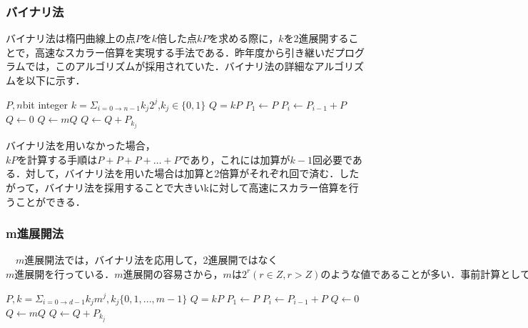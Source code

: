 \documentclass[openany,11pt,papersize]{jsbook}
\begin{document}
\subsubsection{バイナリ法}
バイナリ法は楕円曲線上の点$Pをk倍した点kPを求める際に，k$を2進展開することで，高速なスカラー倍算を実現する手法である．昨年度から引き継いだプログラムでは，このアルゴリズムが採用されていた．バイナリ法の詳細なアルゴリズムを以下に示す．

\begin{algorithm}[H]                   
\caption{binary method}
\label{alg:algB}                          
\begin{algorithmic}                  
\REQUIRE $P, n$bit integer $k = {\displaystyle \Sigma_{i=0 \rightarrow n-1}}k_j 2^j$,$k_j \in \{0,1\}$
\ENSURE $Q = kP$
\STATE $P_1 \leftarrow P$
\STATE $P_i \leftarrow P_{i-1} + P$
\ENDFOR
\STATE $Q \leftarrow 0$
\STATE $Q \leftarrow mQ$
\STATE $Q \leftarrow Q+P_{k_j}$
\ENDFOR
\end{algorithmic}
\end{algorithm}

バイナリ法を用いなかった場合，$kPを計算する手順はP+P+P+…+Pであり，これには加算がk-1$回必要である．対して，バイナリ法を用いた場合は加算と2倍算がそれぞれ回で済む．したがって，バイナリ法を採用することで大きいkに対して高速にスカラー倍算を行うことができる．


\subsubsection{m進展開法}
　$m$進展開法では，バイナリ法を応用して，2進展開ではなく$m進展開を行っている．m進展開の容易さから，mは2^r(r\in Z, r>Z)のような値であることが多い．事前計算として2P, 3P, ・・・, (m-1)Pを計算する必要があるが，
であるとき，rビット単位で計算を行うことができるので，高速化につながる．以下は，m進展開法のアルゴリズムである．$

\begin{algorithm}[H]                   
\caption{window method}
\label{alg:algW}                          
\begin{algorithmic}                  
\REQUIRE $P, k = \Sigma_{i=0\rightarrow d-1}k_j m^j, k_j\{0,1, ... , m-1\}$
\ENSURE $Q = kP$
\STATE $P_1 \leftarrow P$
\STATE $P_i \leftarrow P_{i-1} + P$
\ENDFOR
\STATE $Q \leftarrow 0$
\STATE $Q \leftarrow mQ$
\STATE $Q \leftarrow Q+P_{k_j}$
\ENDFOR
\end{algorithmic}
\end{algorithm}
\end{document}

